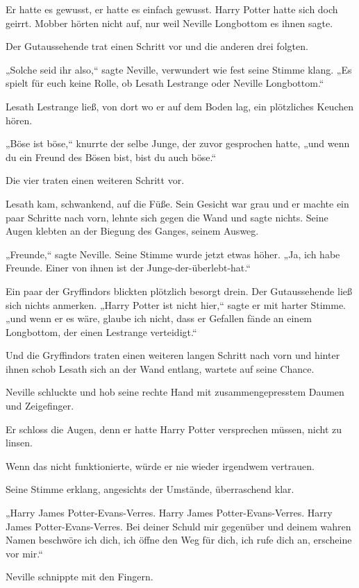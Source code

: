 {Er hatte es gewusst, er hatte es einfach gewusst. Harry Potter hatte sich doch geirrt. Mobber hörten nicht auf, nur weil Neville Longbottom es ihnen sagte.

Der Gutaussehende trat einen Schritt vor und die anderen drei folgten.

„Solche seid ihr also,“ sagte Neville, verwundert wie fest seine Stimme klang. „Es spielt für euch keine Rolle, ob Lesath Lestrange oder Neville Longbottom.“

Lesath Lestrange ließ, von dort wo er auf dem Boden lag, ein plötzliches Keuchen hören.

„Böse ist böse,“ knurrte der selbe Junge, der zuvor gesprochen hatte, „und wenn du ein Freund des Bösen bist, bist du auch böse.“

Die vier traten einen weiteren Schritt vor.

Lesath kam, schwankend, auf die Füße. Sein Gesicht war grau und er machte ein paar Schritte nach vorn, lehnte sich gegen die Wand und sagte nichts. Seine Augen klebten an der Biegung des Ganges, seinem Ausweg.

„Freunde,“ sagte Neville. Seine Stimme wurde jetzt etwas höher. „Ja, ich habe Freunde. Einer von ihnen ist der Junge-der-überlebt-hat.“

Ein paar der Gryffindors blickten plötzlich besorgt drein. Der Gutaussehende ließ sich nichts anmerken. „Harry Potter ist nicht hier,“ sagte er mit harter Stimme. „und wenn er es wäre, glaube ich nicht, dass er Gefallen fände an einem Longbottom, der einen Lestrange verteidigt.“

Und die Gryffindors traten einen weiteren langen Schritt nach vorn und hinter ihnen schob Lesath sich an der Wand entlang, wartete auf seine Chance.

Neville schluckte und hob seine rechte Hand mit zusammengepresstem Daumen und Zeigefinger.

Er schloss die Augen, denn er hatte Harry Potter versprechen müssen, nicht zu linsen.

Wenn das nicht funktionierte, würde er nie wieder irgendwem vertrauen.

Seine Stimme erklang, angesichts der Umstände, überraschend klar.

„Harry James Potter-Evans-Verres. Harry James Potter-Evans-Verres. Harry James Potter-Evans-Verres. Bei deiner Schuld mir gegenüber und deinem wahren Namen beschwöre ich dich, ich öffne den Weg für dich, ich rufe dich an, erscheine vor mir.“

Neville schnippte mit den Fingern.

}
